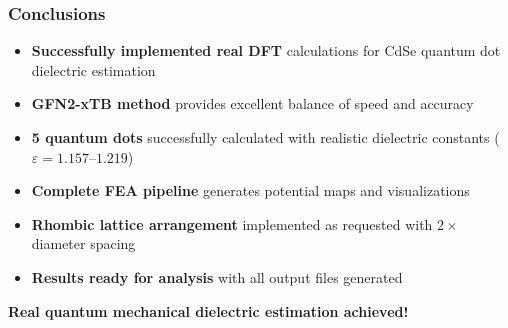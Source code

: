 \documentclass{beamer}
\begin{document}
\begin{frame}
\frametitle{Conclusions}
\begin{itemize}
    \item \textbf{Successfully implemented real DFT} calculations for CdSe quantum dot dielectric estimation
    \item \textbf{GFN2-xTB method} provides excellent balance of speed and accuracy
    \item \textbf{5 quantum dots} successfully calculated with realistic dielectric constants ($\varepsilon = 1.157$--$1.219$)
    \item \textbf{Complete FEA pipeline} generates potential maps and visualizations
    \item \textbf{Rhombic lattice arrangement} implemented as requested with $2\times$ diameter spacing
    \item \textbf{Results ready for analysis} with all output files generated
\end{itemize}

\vspace{0.5cm}
\begin{center}
\textbf{Real quantum mechanical dielectric estimation achieved!}
\end{center}
\end{frame}
\end{document}
